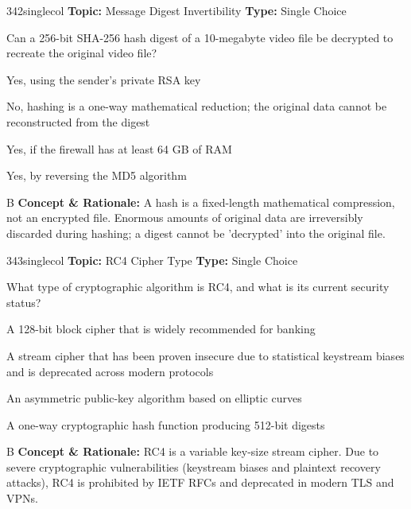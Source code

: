 \begin{qcard}{342}{singlecol}
\textcolor{darkslate!75}{\small\textbf{Topic:} Message Digest Invertibility \hfill \textbf{Type:} Single Choice}\vspace{0.4em}\par
Can a 256-bit SHA-256 hash digest of a 10-megabyte video file be decrypted to recreate the original video file?
\begin{qoptions}
\item Yes, using the sender's private RSA key
\item No, hashing is a one-way mathematical reduction; the original data cannot be reconstructed from the digest
\item Yes, if the firewall has at least 64 GB of RAM
\item Yes, by reversing the MD5 algorithm
\end{qoptions}
\end{qcard}
\nopagebreak
\begin{explainbox}{B}
\textbf{Concept \& Rationale:} A hash is a fixed-length mathematical compression, not an encrypted file. Enormous amounts of original data are irreversibly discarded during hashing; a digest cannot be 'decrypted' into the original file.
\end{explainbox}

\begin{qcard}{343}{singlecol}
\textcolor{darkslate!75}{\small\textbf{Topic:} RC4 Cipher Type \hfill \textbf{Type:} Single Choice}\vspace{0.4em}\par
What type of cryptographic algorithm is RC4, and what is its current security status?
\begin{qoptions}
\item A 128-bit block cipher that is widely recommended for banking
\item A stream cipher that has been proven insecure due to statistical keystream biases and is deprecated across modern protocols
\item An asymmetric public-key algorithm based on elliptic curves
\item A one-way cryptographic hash function producing 512-bit digests
\end{qoptions}
\end{qcard}
\nopagebreak
\begin{explainbox}{B}
\textbf{Concept \& Rationale:} RC4 is a variable key-size stream cipher. Due to severe cryptographic vulnerabilities (keystream biases and plaintext recovery attacks), RC4 is prohibited by IETF RFCs and deprecated in modern TLS and VPNs.
\end{explainbox}

